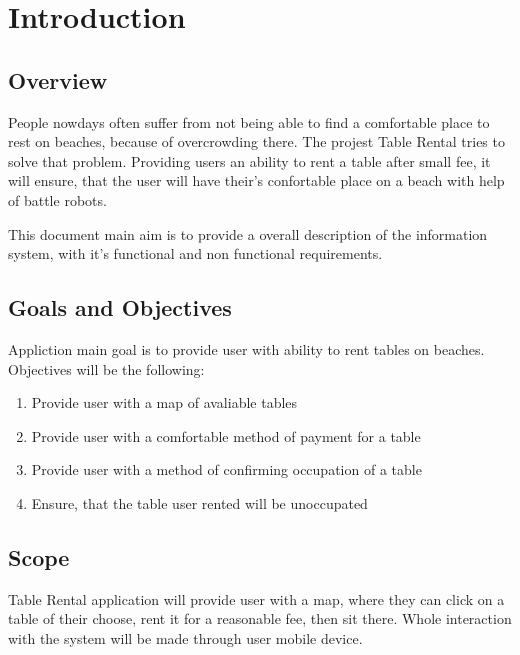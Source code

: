 \documentclass[14pt]{extarticle}
\begin{document}
\tableofcontents{}

\newpage

\section{Introduction}
\subsection{Overview}
People nowdays often suffer from not being able to find a comfortable place to rest on beaches, because of overcrowding there. The projest Table Rental tries to solve that problem. Providing users an ability to rent a table after small fee, it will ensure, that the user will have their's confortable place on a beach with help of battle robots.

\vspace{1cm}

This document main aim is to provide a overall description of the information system, with it's functional and non functional requirements.
\subsection{Goals and Objectives}
Appliction main goal is to provide user with ability to rent tables on beaches. Objectives will be the following:

\begin{enumerate}
    \item Provide user with a map of avaliable tables
    \item Provide user with a comfortable method of payment for a table
    \item Provide user with a method of confirming occupation of a table
    \item Ensure, that the table user rented will be unoccupated
\end{enumerate}

\subsection{Scope}
Table Rental application will provide user with a map, where they can click on a table of their choose, rent it for a reasonable fee, then sit there. Whole interaction with the system will be made through user mobile device.
\end{document}
